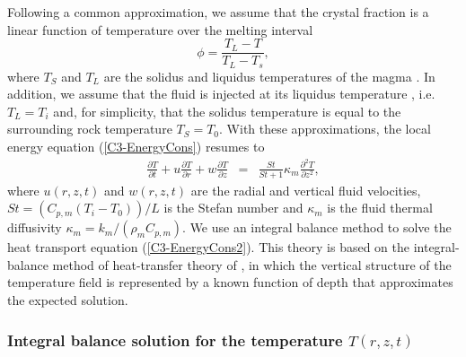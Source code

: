 Following a common approximation, we  assume that the crystal fraction
is a linear function of temperature over the melting interval
\begin{equation}
  \phi = \frac{T_L-T}{T_L-T_s},
  \label{C3-meltfraction}
\end{equation}
where $T_S$ and $T_L$ are the solidus and liquidus temperatures of the
magma \citep{Hort:1997hk,Michaut:2006di}. In  addition, we assume that
the fluid is  injected at its liquidus temperature ,  i.e. $T_L = T_i$
and,  for simplicity,  that the  solidus temperature  is equal  to the
surrounding rock  temperature $T_S  =T_0$. With  these approximations,
the local energy equation (\ref{C3-EnergyCons}) resumes to
\begin{eqnarray}
  \frac{\partial T}{\partial t}+ u\frac{\partial T}{\partial r}
  + w\frac{\partial T}{\partial z}  &=& \frac{ St}{St+1}\kappa_m  \frac{\partial^2
                                        T}{\partial               z^2},
                                        \label{C3-EnergyCons2}
\end{eqnarray}
where  $u(r,z,t)$ and  $w(r,z,t)$ are  the radial  and vertical  fluid
velocities, $St =\left(C_{p,m}(T_i-T_0)\right)/L$ is the Stefan number
and     $\kappa_m$     is     the    fluid     thermal     diffusivity
$\kappa_m = k_m/(\rho_m C_{p,m})$.  We  use an integral balance method
to  solve the  heat transport  equation (\ref{C3-EnergyCons2}).   This
theory is based on the integral-balance method of heat-transfer theory
of  \citet{Goodman:1958ue}, in  which  the vertical  structure of  the
temperature field  is represented  by a known  function of  depth that
approximates the expected solution.

\subsubsection*{Integral   balance   solution   for   the   temperature
  $T(r,z,t)$}


